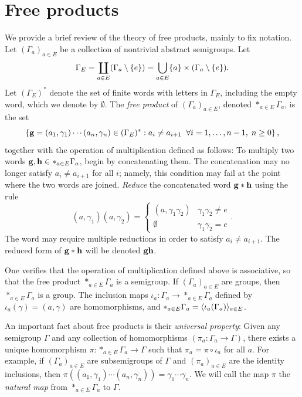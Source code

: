 \section{Free products}
\label{subsectionfreeproducts}
We provide a brief review of the theory of free products, mainly to fix notation. Let $(\Gamma_a)_{a\in E}$ be a collection of nontrivial abstract semigroups. Let
\[
\Gamma_E = \coprod_{a\in E} (\Gamma_a\setminus\{e\}) = \bigcup_{a\in E} \{a\}\times (\Gamma_a\setminus\{e\}).
\]
Let $(\Gamma_E)^*$ denote the set of finite words with letters in $\Gamma_E$, including the empty word, which we denote by $\emptyset$. The \emph{free product} of $(\Gamma_a)_{a\in E}$, denoted $\ast_{a\in E}\Gamma_a$, is the set
\[
\left\{\mathbf g = (a_1,\gamma_1)\cdots(a_n,\gamma_n)\in (\Gamma_E)^* : a_i\neq a_{i + 1} \;\;\forall i = 1,\ldots,n - 1, \; n \geq 0\right\},
\]
together with the operation of multiplication defined as follows: To multiply two words $\mathbf g,\mathbf h\in \ast_{a\in E} \Gamma_a$, begin by concatenating them. The concatenation may no longer satisfy $a_i\neq a_{i + 1}$ for all $i$; namely, this condition may fail at the point where the two words are joined. \emph{Reduce} the concatenated word $\mathbf g\ast\mathbf h$ using the rule
\[
(a,\gamma_1)(a,\gamma_2) = \begin{cases}
(a,\gamma_1 \gamma_2) & \gamma_1 \gamma_2 \neq e\\
\emptyset & \gamma_1 \gamma_2 = e
\end{cases}.
\]
The word may require multiple reductions in order to satisfy $a_i\neq a_{i + 1}$. The reduced form of $\mathbf g\ast\mathbf h$ will be denoted $\mathbf g\mathbf h$.

One verifies that the operation of multiplication defined above is associative, so that the free product $\ast_{a\in E}\Gamma_a$ is a semigroup. If $(\Gamma_a)_{a\in E}$ are groups, then $\ast_{a\in E}\Gamma_a$ is a group. The inclusion maps $\iota_a: \Gamma_a\to \ast_{a\in E}\Gamma_a$ defined by $\iota_a(\gamma) = (a,\gamma)$ are homomorphisms, and $\ast_{a\in E}\Gamma_a = \langle \iota_a(\Gamma_a)\rangle_{a\in E}$.

An important fact about free products is their \emph{universal property}: Given any semigroup $\Gamma$ and any collection of homomorphisms $(\pi_a: \Gamma_a\to \Gamma)$, there exists a unique homomorphism $\pi:\ast_{a\in E}\Gamma_a\to \Gamma$ such that $\pi_a = \pi\circ\iota_a$ for all $a$. For example, if $(\Gamma_a)_{a\in E}$ are subsemigroups of $\Gamma$ and $(\pi_a)_{a\in E}$ are the identity inclusions, then $\pi((a_1,\gamma_1)\cdots(a_n,\gamma_n)) = \gamma_1\cdots \gamma_n$. We will call the map $\pi$ the \emph{natural map} from $\ast_{a\in E} \Gamma_a$ to $\Gamma$.


